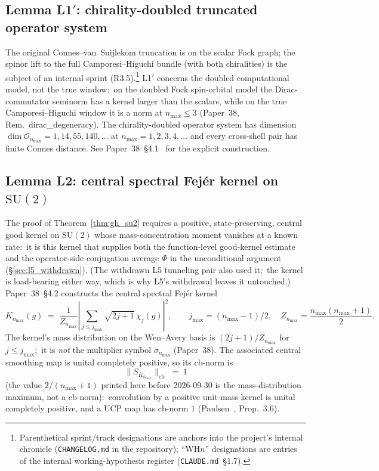 \documentclass[11pt,a4paper]{article}
\theoremstyle{plain}
\theoremstyle{definition}
\newcommand{\nmax}{n_{\max}}
\newcommand{\Op}{\mathcal{O}}
\newcommand{\cbnorm}[1]{\lVert #1 \rVert_{\mathrm{cb}}}
\newcommand{\SU}{\mathrm{SU}}
\begin{document}
\subsection{Lemma L1$'$: chirality-doubled truncated operator system}

The original Connes--van~Suijlekom truncation is on the scalar Fock
graph; the spinor lift to the full Camporesi--Higuchi bundle (with
both chiralities) is the subject of an internal sprint
(R3.5).\footnote{Parenthetical sprint/track designations are anchors
into the project's internal chronicle (\texttt{CHANGELOG.md} in the
repository); ``WH$n$'' designations are entries of the internal
working-hypothesis register (\texttt{CLAUDE.md}~\S1.7).}  L1$'$
concerns the doubled computational model, not the true window:\ on
the doubled Fock spin-orbital model the Dirac-commutator seminorm has
a kernel larger than the scalars, while on the true
Camporesi--Higuchi window it is a norm at $\nmax \le 3$ (Paper~38,
Rem.~dirac\_degeneracy).  The
chirality-doubled operator system has dimension
$\dim \Op_{\nmax} = 1, 14, 55, 140, \dots$ at
$\nmax = 1, 2, 3, 4, \dots$ and every cross-shell pair has finite
Connes distance.  See Paper~38~\S 4.1~\cite{paper38} for the
explicit construction.

\subsection{Lemma L2: central spectral Fej\'er kernel on $\SU(2)$}

The proof of Theorem~\ref{thm:gh_su2} requires a positive,
state-preserving, central good kernel on $\SU(2)$ whose
mass-concentration moment vanishes at a known rate:\ it is this kernel
that supplies both the function-level good-kernel estimate and the
operator-side conjugation average $\Phi$ in the unconditional argument
(\S\ref{sec:l5_withdrawn}).  (The withdrawn L5 tunneling pair also used
it;\ the kernel is load-bearing either way, which is why L5's withdrawal
leaves it untouched.)  Paper~38~\S 4.2 constructs the central spectral
Fej\'er kernel
\begin{equation}
K_{\nmax}(g) \;=\; \frac{1}{Z_{\nmax}}
\left|\sum_{j \le j_{\max}} \sqrt{2j+1}\,\chi_{j}(g)\right|^{2},
\qquad
j_{\max} = (\nmax-1)/2,
\quad
Z_{\nmax} = \frac{\nmax(\nmax+1)}{2}.
\label{eq:fejer_kernel}
\end{equation}
The kernel's mass distribution on the Wen--Avery basis is
$(2j+1)/Z_{\nmax}$ for $j \le j_{\max}$;\ it is \emph{not} the
multiplier symbol $\sigma_{\nmax}$ (Paper~38).  The associated central
smoothing map is unital completely positive, so its cb-norm is
\begin{equation}
\cbnorm{S_{K_{\nmax}}} \;=\; 1
\label{eq:cb_norm}
\end{equation}
(the value $2/(\nmax+1)$ printed here before 2026-09-30 is the
mass-distribution maximum, not a cb-norm):\ convolution by a
positive unit-mass kernel is unital completely positive, and a UCP map
has cb-norm $1$ (Paulsen~\cite{paulsen2002}, Prop.~3.6).
\end{document}
